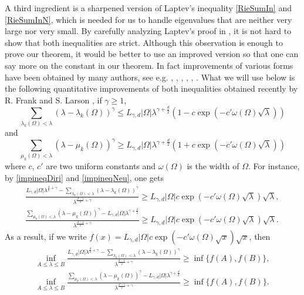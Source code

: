 \documentclass[11pt,letterpaper]{amsart}
\numberwithin{equation}{section}
\theoremstyle{plain}
\theoremstyle{plain}
\numberwithin{equation}{section}
\theoremstyle{remark}
\begin{document}
	A third ingredient  is a sharpened version of Laptev's inequality \eqref{RieSumIn} and \eqref{RieSumInN}, which is needed for us to handle eigenvalues that are neither very large nor very small.  By carefully analyzing Laptev's proof in \cite{AL}, it is not hard to show that both inequalities are strict. Although this observation is enough to prove our theorem, it would be better to use an improved version  so that one can say more on the constant in our theorem. In fact  improvements of various forms have been obtained by many authors, see e.g. \cite{Mela}, \cite{GLW11}, \cite{HPS21}, \cite{Lar17}, \cite{LT06}, \cite{Wei08}. What we will use below is the following  quantitative improvements of both inequalities obtained recently by   R. Frank and S. Larson  \cite{FL24convex}, if $\gamma\ge 1$,
	\begin{equation}\label{impineqDiri}
		 \sum_{\lambda_k(\Omega)< \lambda} (\lambda-\lambda_k(\Omega))^\gamma\le L_{\gamma,d}|\Omega| \lambda^{\gamma+\frac{d}{2}}(1-c\exp(-c'\omega(\Omega)\sqrt\lambda))
	\end{equation}
	and
	\begin{equation}\label{impineqNeu}
		\sum_{\mu_k(\Omega)< \lambda} (\lambda-\mu_k(\Omega))^\gamma \ge L_{\gamma,d}|\Omega| \lambda^{\gamma+\frac{d}{2}}(1+c\exp(-c'\omega(\Omega)\sqrt\lambda))
	\end{equation}
	where $c$, $c'$ are two uniform constants and $\omega(\Omega)$ is the width of $\Omega$. For instance, by \eqref{impineqDiri} and \eqref{impineqNeu}, one gets
	\[
	\begin{aligned}
	 \frac{L_{\gamma,d} |\Omega| \lambda^{\frac{d}{2}+\gamma}- \sum_{\lambda_k(\Omega)<\lambda} (\lambda- \lambda_k(\Omega))^{\gamma }}{\lambda^{\frac{d-1}{2}+\gamma}}\ge L_{\gamma,d} |\Omega|  c  \exp(-c' \omega(\Omega)\sqrt{\lambda}) \sqrt{\lambda},\\
	 \frac{\sum_{\mu_k(\Omega)< \lambda} (\lambda-\mu_k(\Omega))^\gamma - L_{\gamma,d}|\Omega| \lambda^{\gamma+\frac{d}{2}}}{\lambda^{\frac{d-1}{2}+\gamma}}\ge L_{\gamma,d} |\Omega|  c  \exp(-c' \omega(\Omega)\sqrt{\lambda}) \sqrt{\lambda}.
	 \end{aligned}
	\]
	As a result, if we write $f(x)=L_{\gamma,d} |\Omega|  c  \exp(-c' \omega(\Omega)\sqrt{x}) \sqrt{x}$, then 
\begin{equation}\label{KAB}
		\begin{aligned}
\inf_{A\le \lambda \le B}	\frac{L_{\gamma,d} |\Omega| \lambda^{\frac{d}{2}+\gamma}- \sum_{\lambda_k(\Omega)<\lambda} (\lambda- \lambda_k(\Omega))^{\gamma }}{\lambda^{\frac{d-1}{2}+\gamma}} \ge \inf\{f(A), f(B)\},\\
\inf_{A\le \lambda \le B}	\frac{\sum_{\mu_k(\Omega)< \lambda} (\lambda-\mu_k(\Omega))^\gamma - L_{\gamma,d}|\Omega| \lambda^{\gamma+\frac{d}{2}}}{\lambda^{\frac{d-1}{2}+\gamma}} \ge \inf\{f(A), f(B)\}.
        \end{aligned}
\end{equation}
	 
\end{document}
